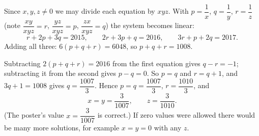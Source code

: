 Since $x,y,z\ne0$ we may divide each equation by $xyz$. With $p=\dfrac{1}{x}$, $q=\dfrac{1}{y}$, $r=\dfrac{1}{z}$ (note $\dfrac{xy}{xyz}=r$, $\dfrac{yz}{xyz}=p$, $\dfrac{zx}{xyz}=q$) the system becomes linear:
\[
r+2p+3q=2015,\qquad 2r+3p+q=2016,\qquad 3r+p+2q=2017 .
\]
Adding all three: $6(p+q+r)=6048$, so $p+q+r=1008$.

Subtracting $2(p+q+r)=2016$ from the first equation gives $q-r=-1$; subtracting it from the second gives $p-q=0$. So $p=q$ and $r=q+1$, and $3q+1=1008$ gives $q=\dfrac{1007}{3}$. Hence $p=q=\dfrac{1007}{3}$, $r=\dfrac{1010}{3}$, and
\[
\boxed{x=y=\dfrac{3}{1007},\qquad z=\dfrac{3}{1010}} .
\]
(The poster's value $x=\dfrac{3}{1007}$ is correct.) If zero values were allowed there would be many more solutions, for example $x=y=0$ with any $z$.
